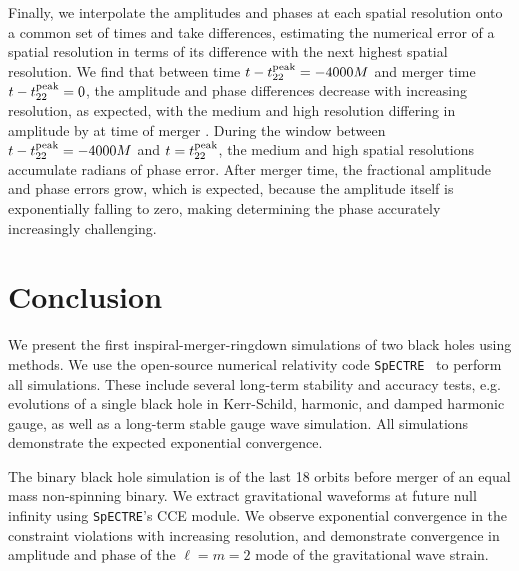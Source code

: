 \begin{bibunit}[unsrtnat]
Finally, we interpolate the amplitudes and phases at each spatial resolution
onto a common set of times and take differences, estimating the numerical error
of a spatial resolution in terms of its difference with the next highest spatial
resolution. We find that between time $t - t_{22}^{\rm peak}=-4000 M$ and merger
time $t-t_{22}^{\rm peak}=0$, the amplitude and phase differences decrease with
increasing resolution, as expected, with the medium and high resolution
differing in amplitude by  at time of merger 
. During the window between
$t - t_{22}^{\rm peak}=-4000 M$ and $t = t_{22}^{\rm peak}$, the medium and high
spatial resolutions accumulate  radians of phase error. After
merger time, the fractional amplitude and phase errors grow, which is expected,
because the amplitude itself is exponentially falling to zero, making
determining the phase accurately increasingly challenging.

\section{Conclusion\label{sec:conclusion}}

We present the first inspiral-merger-ringdown simulations of two black
holes using  methods. We use the open-source numerical
relativity code \texttt{SpECTRE}~\cite{spectrecode_2024} to perform all
simulations. These include several long-term stability and accuracy tests, e.g.
evolutions of a single black hole in Kerr-Schild, harmonic, and damped
harmonic gauge, as well as a long-term stable gauge wave simulation. All
simulations demonstrate the expected exponential convergence.

The binary black hole simulation is of the last 18 orbits before merger of an
equal mass non-spinning binary. We extract gravitational waveforms at future
null infinity using \texttt{SpECTRE}'s CCE module. We observe exponential
convergence in the constraint violations with increasing resolution, and
demonstrate convergence in amplitude and phase of the $\ell=m=2$ mode of the
gravitational wave strain. 


\end{bibunit}
